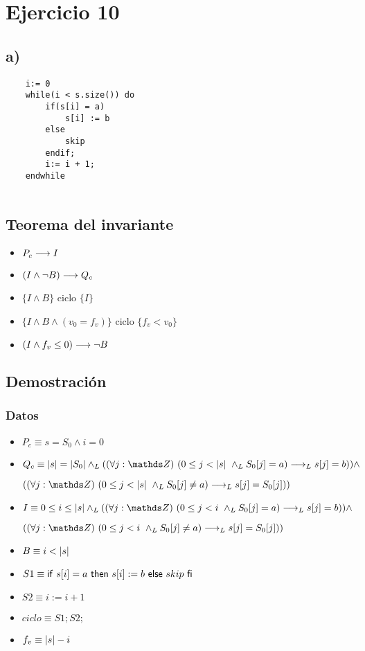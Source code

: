 \documentclass{article}
\begin{document}
\section*{Ejercicio 10}

\subsection*{a)}

\begin{verbatim}
    i:= 0
    while(i < s.size()) do
        if(s[i] = a)
            s[i] := b
        else
            skip
        endif;
        i:= i + 1;
    endwhile
    
\end{verbatim}
\subsection*{Teorema del invariante}
\begin{itemize}
    \item $P_{c} \longrightarrow I$
    \item $(I \wedge \neg B) \longrightarrow Q_{c}$
    \item $\{I \wedge B\}$ ciclo $\{ I \}$
    \item $\{I \wedge B \wedge (v_{0} = f_{v})\}$ ciclo $\{f_{v} < v_{0}\}$
    \item $(I \wedge f_{v} \leq 0) \longrightarrow \neg B$
\end{itemize}

\subsection*{Demostración}
\subsubsection*{Datos}
\begin{itemize}
    \item $P_{c}    \equiv s = S_{0} \wedge i = 0 $
    \item $Q_{c}    \equiv \longitud{s} = \longitud{S_{0}} \yLuego (\paraTodo{j}{(0}{\longitud{s}} \yLuego S_{0}[j] = a) \implicaLuego s[j] = b)) \wedge $

    $ (\paraTodo{j}{(0}{\longitud{s}} \yLuego S_{0}[j] \neq a) \implicaLuego s[j] = S_{0}[j])) $

    \item $I        \equiv 0 \leq i \leq \longitud{s} \yLuego (\paraTodo{j}{(0}{i} \yLuego S_{0}[j] = a) \implicaLuego s[j] = b)) \wedge $

    $ (\paraTodo{j}{(0}{i} \yLuego S_{0}[j] \neq a) \implicaLuego s[j] = S_{0}[j])) $

    \item $B        \equiv i < |s|$
    \item $S1       \equiv \mathsf{if}\ s[i]=a\ \mathsf{then}\ s[i]:=b\ \mathsf{else}\ skip\ \mathsf{fi}$
    \item $S2       \equiv i:= i + 1$
    \item $ciclo    \equiv S1;S2;$
    \item $f_{v}    \equiv |s| - i$
\end{itemize}
\end{document}
